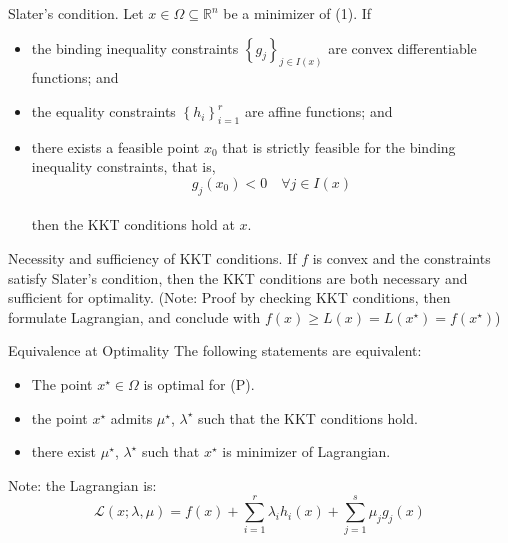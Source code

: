 \begin{theorem}[L7.4]{Slater's condition.}
    Let $x \in \Omega \subseteq \mathbb{R}^n$ be a minimizer of (1). If
    \begin{itemize}[leftmargin=*]
        \item the binding inequality constraints $\left\{g_j\right\}_{j \in I(x)}$ are convex differentiable functions; and 
        \item the equality constraints $\left\{h_i\right\}_{i=1}^r$ are affine functions; and
        \item there exists a feasible point $x_0$ that is strictly feasible for the binding inequality constraints, that is,
        \vspace{-4pt}\\
        $$
        g_j\left(x_0\right)<0 \quad \forall j \in I(x)
        $$
        \vspace{-4pt}\\
        then the KKT conditions hold at $x$.
    \end{itemize}
\end{theorem}

\begin{theorem}[L7.5]{Necessity and sufficiency of KKT conditions.}
    If $f$ is convex and the constraints satisfy Slater's condition, then the KKT conditions are both necessary and sufficient for optimality.
    (Note: Proof by checking KKT conditions, then formulate Lagrangian, and conclude with $f(x) \geq L(x) = L(x^\star) = f(x^\star)$)
\end{theorem}


\begin{remark}[L8.1]{Equivalence at Optimality}
    The following statements are equivalent:
    \begin{itemize}[leftmargin=*]
        \item The point $x^\star\in \Omega$ is optimal for (P).
        \item the point $x^\star$ admits $\mu^\star$, $\lambda^\star$ such that the KKT conditions hold.
        \item there exist $\mu^\star$, $\lambda^\star$ such that $x^\star$ is minimizer of Lagrangian.
    \end{itemize}
    Note: the Lagrangian is:
    \vspace{-4pt}\\
    $$
    \mathcal{L}(x ; \lambda, \mu)=f(x)+\sum_{i=1}^{r} \lambda_{i} h_{i}(x)+\sum_{j=1}^{s} \mu_{j} g_{j}(x)
    $$
    \vspace{-4pt}
\end{remark}


